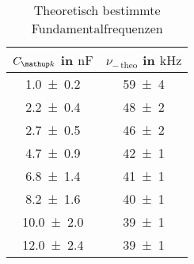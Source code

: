 \begin{table}
\centering
\caption{Theoretisch bestimmte Fundamentalfrequenzen}
\label{fig:teilb_frequenzen_theo}
\begin{tabular}{S S }
\toprule
{$C\ua{k}$ in $\si{\nano\farad}$} &{$\nu_{-\,\mathup{theo}}$ in $\si{\kilo\hertz}$}  \\ 
\midrule
 \num{1.0\pm0.2} & \num{59\pm4}\\
\num{2.2\pm0.4} & \num{48\pm2}\\
\num{2.7\pm0.5} & \num{46\pm2}\\
\num{4.7\pm0.9} & \num{42\pm1}\\
\num{6.8\pm1.4} & \num{41\pm1}\\
\num{8.2\pm1.6} & \num{40\pm1}\\
\num{10.0\pm2.0} & \num{39\pm1}\\
\num{12.0\pm2.4} & \num{39\pm1}\\
\bottomrule
\end{tabular}
\end{table}
